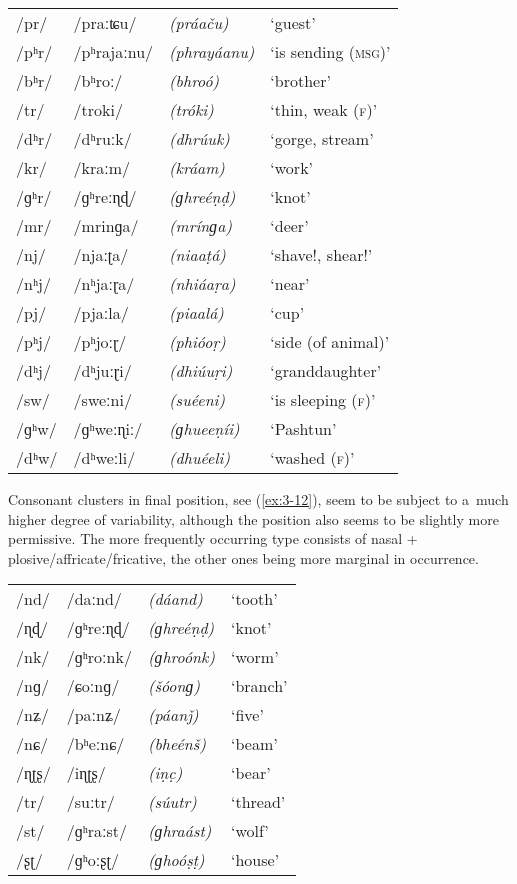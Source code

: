 \begin{exe}
\extab
\label{ex:3-11}
\begin{tabular}{ l l l l }
/pr/ &
/praːʨu/ &
\textit{(práaču)} &
`guest'\\
/pʰr/ &
/pʰrajaːnu/ &
\textit{(phrayáanu)} &
`is sending (\textsc{msg)}'\\
/bʰr/ &
/bʰroː/ &
\textit{(bhroó)} &
`brother'\\
/tr/ &
/troki/ &
\textit{(tróki)} &
`thin, weak (\textsc{f)}'\\
/dʰr/ &
/dʰruːk/ &
\textit{(dhrúuk)} &
`gorge, stream' \\
/kr/ &
/kraːm/ &
\textit{(kráam)} &
`work' \\
/ɡʰr/ &
/ɡʰreːɳɖ/ &
\textit{(ɡhreéṇḍ)} &
`knot' \\
/mr/ &
/mrinɡa/ &
\textit{(mrínɡa)} &
`deer'\\
/nj/ &
/njaːʈa/ &
\textit{(niaaṭá)} &
`shave!, shear!' \\
/nʰj/ &
/nʰjaːɽa/ &
\textit{(nhiáaṛa)} &
`near'\\
/pj/ &
/pjaːla/ &
\textit{(piaalá)} &
`cup'\\
/pʰj/ &
/pʰjoːɽ/ &
\textit{(phióoṛ)} &
`side (of animal)' \\
/dʰj/ &
/dʰjuːɽi/ &
\textit{(dhiúuṛi)} &
`granddaughter'\\
/sw/ &
/sweːni/ &
\textit{(suéeni) } &
`is sleeping (\textsc{f)}'\\
/ɡʰw/ &
/ɡʰweːɳiː/ &
\textit{(ɡhueeṇíi)} &
`Pashtun'\\
/dʰw/ &
/dʰweːli/ &
\textit{(dhuéeli)} &
`washed (\textsc{f)}'\\
\end{tabular}
\end{exe}


Consonant clusters in final position, see (\ref{ex:3-12}), seem to be subject to a~much higher degree of variability, although the position also seems to be slightly more permissive. The more frequently occurring type consists of nasal + plosive/affricate/fricative, the other ones being more marginal in occurrence. 


\begin{exe}
\extab
\label{ex:3-12}
\begin{tabular}{ l l l l }
/nd/ &
/daːnd/ &
\textit{(dáand)} &
`tooth'\\
/ɳɖ/ &
/ɡʰreːɳɖ/ &
\textit{(ɡhreéṇḍ)} &
`knot'\\
/nk/ &
/ɡʰroːnk/ &
\textit{(ɡhroónk)} &
`worm'\\
/nɡ/ &
/ɕoːnɡ/ &
\textit{(šóonɡ) } &
`branch'\\
/nʑ/ &
/paːnʑ/ &
\textit{(páanǰ) } &
`five' \\
/nɕ/ &
/bʰeːnɕ/ &
\textit{(bheénš) } &
`beam' \\
/ɳʈʂ/ &
/iɳʈʂ/ &
\textit{(iṇc̣) } &
`bear' \\
/tr/ &
/suːtr/ &
\textit{(súutr)} &
`thread' \\
/st/ &
/ɡʰraːst/ &
\textit{(ɡhraást)} &
`wolf' \\
/ʂʈ/ &
/ɡʰoːʂʈ/ &
\textit{(ɡhoóṣṭ) } &
`house'\\
\end{tabular}
\end{exe}


